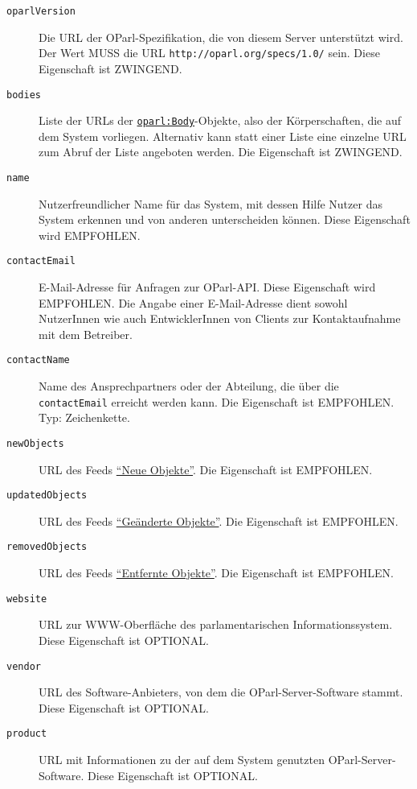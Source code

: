 \documentclass[,a4paper]{article}
\begin{document}
\begin{description}
\item[\texttt{oparlVersion}]
Die URL der OParl-Spezifikation, die von diesem Server unterstützt wird.
Der Wert MUSS die URL \texttt{http://oparl.org/specs/1.0/} sein. Diese
Eigenschaft ist ZWINGEND.
\item[\texttt{bodies}]
Liste der URLs der
\hyperref[oparlux5fbody]{\texttt{oparl:Body}}-Objekte, also der
Körperschaften, die auf dem System vorliegen. Alternativ kann statt
einer Liste eine einzelne URL zum Abruf der Liste angeboten werden. Die
Eigenschaft ist ZWINGEND.
\item[\texttt{name}]
Nutzerfreundlicher Name für das System, mit dessen Hilfe Nutzer das
System erkennen und von anderen unterscheiden können. Diese Eigenschaft
wird EMPFOHLEN.
\item[\texttt{contactEmail}]
E-Mail-Adresse für Anfragen zur OParl-API. Diese Eigenschaft wird
EMPFOHLEN. Die Angabe einer E-Mail-Adresse dient sowohl NutzerInnen wie
auch EntwicklerInnen von Clients zur Kontaktaufnahme mit dem Betreiber.
\item[\texttt{contactName}]
Name des Ansprechpartners oder der Abteilung, die über die
\texttt{contactEmail} erreicht werden kann. Die Eigenschaft ist
EMPFOHLEN. Typ: Zeichenkette.
\item[\texttt{newObjects}]
URL des Feeds \hyperref[feedux5fneueux5fobjekte]{``Neue Objekte''}. Die
Eigenschaft ist EMPFOHLEN.
\item[\texttt{updatedObjects}]
URL des Feeds \hyperref[feedux5fgeaenderteux5fobjekte]{``Geänderte
Objekte''}. Die Eigenschaft ist EMPFOHLEN.
\item[\texttt{removedObjects}]
URL des Feeds \hyperref[feedux5fentfernteux5fobjekte]{``Entfernte
Objekte''}. Die Eigenschaft ist EMPFOHLEN.
\item[\texttt{website}]
URL zur WWW-Oberfläche des parlamentarischen Informationssystem. Diese
Eigenschaft ist OPTIONAL.
\item[\texttt{vendor}]
URL des Software-Anbieters, von dem die OParl-Server-Software stammt.
Diese Eigenschaft ist OPTIONAL.
\item[\texttt{product}]
URL mit Informationen zu der auf dem System genutzten
OParl-Server-Software. Diese Eigenschaft ist OPTIONAL.
\end{description}

\end{document}
